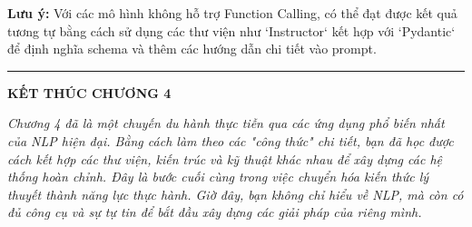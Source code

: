 \textbf{Lưu ý:} Với các mô hình không hỗ trợ Function Calling, có thể đạt được kết quả tương tự bằng cách sử dụng các thư viện như `Instructor` kết hợp với `Pydantic` để định nghĩa schema và thêm các hướng dẫn chi tiết vào prompt.

\bigskip
\hrule
\bigskip

\begin{center}
    \textbf{\Large KẾT THÚC CHƯƠNG 4}
\end{center}

\textit{Chương 4 đã là một chuyến du hành thực tiễn qua các ứng dụng phổ biến nhất của NLP hiện đại. Bằng cách làm theo các "công thức" chi tiết, bạn đã học được cách kết hợp các thư viện, kiến trúc và kỹ thuật khác nhau để xây dựng các hệ thống hoàn chỉnh. Đây là bước cuối cùng trong việc chuyển hóa kiến thức lý thuyết thành năng lực thực hành. Giờ đây, bạn không chỉ hiểu về NLP, mà còn có đủ công cụ và sự tự tin để bắt đầu xây dựng các giải pháp của riêng mình.}